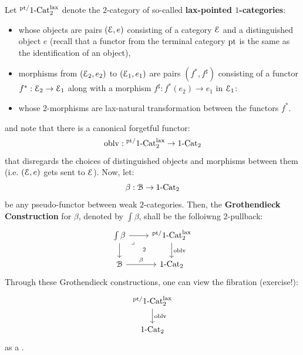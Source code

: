                 \begin{definition} \label{def: grothendieck_construction} 
                    Let ${}^{\mathrm{pt}/}1\text{-}\mathrm{Cat}^{\mathrm{lax}}_2$ denote the $2$-category of so-called \textbf{lax-pointed $1$-categories}:
                        \begin{itemize}
                            \item whose objects are pairs $(\mathcal{E}, e)$ consisting of a category $\mathcal{E}$ and a distinguished object $e$ (recall that a functor from the terminal category $\mathrm{pt}$ is the same as the identification of an object),
                            \item morphisms from $(\mathcal{E}_2, e_2)$ to $(\mathcal{E}_1, e_1)$ are pairs $(f^*, f^{\sharp})$ consisting of a functor $f^*: \mathcal{E}_2 \to \mathcal{E}_1$ along with a morphism $f^{\sharp}: f^*(e_2) \to e_1$ in $\mathcal{E}_1$:
                            \item whose $2$-morphisms are lax-natural transformation between the functors $f^*$.
                        \end{itemize}
                    and note that there is a canonical forgetful functor:
                        $$\mathrm{oblv}: {}^{\mathrm{pt}/}1\text{-}\mathrm{Cat}^{\mathrm{lax}}_2 \to 1\text{-}\mathrm{Cat}_2$$
                    that disregards the choices of distinguished objects and morphisms between them (i.e. $(\mathcal{E}, e)$ gets sent to $\mathcal{E}$). Now, let:
                        $$\beta: \mathcal{B} \to 1\text{-}\mathrm{Cat}_2$$
                    be any pseudo-functor between weak $2$-categories. Then, the \textbf{Grothendieck Construction} for $\beta$, denoted by $\int \beta$, shall be the folloiwng $2$-pullback:
                        $$
                            \begin{tikzcd}
                            	{\int \beta} & {{}^{\pt/}1\-\Cat^{\lax}_2} \\
                            	\calB & {1\-\Cat_2}
                            	\arrow[from=1-1, to=2-1]
                            	\arrow["\beta", from=2-1, to=2-2]
                            	\arrow["\oblv", from=1-2, to=2-2]
                            	\arrow[from=1-1, to=1-2]
                            	\arrow["2"{description}, "\lrcorner"{anchor=center, pos=0.125}, draw=none, from=1-1, to=2-2]
                            \end{tikzcd}
                        $$
                    Through these Grothendieck constructions, one can view the fibration (exercise!):
                        $$
                            \begin{tikzcd}
                            	{{}^{\pt/}1\-\Cat^{\lax}_2} \\
                            	{1\-\Cat_2}
                            	\arrow["\oblv", from=1-1, to=2-1]
                            \end{tikzcd}
                        $$
                    as a . 
                \end{definition}
